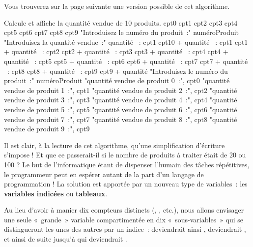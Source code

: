		Vous trouverez sur la page suivante
		une version possible de cet algorithme.
	
		\begin{LDA}
		\LComment Calcule et affiche la quantité vendue de 10 produits.
			\Empty
			\Empty
			\Let cpt0 
			\Let cpt1 
			\Let cpt2 
			\Let cpt3 
			\Let cpt4 
			\Let cpt5 
			\Let cpt6 
			\Let cpt7 
			\Let cpt8 
			\Let cpt9 
			\Empty
			\Write "Introduisez le numéro du produit~:"
			\Read numéroProduit
			\Empty
			\Empty
				\Write "Introduisez la quantité vendue~:"
				\Read quantité
				\Empty
					~: cpt1 \Gets cpt10 + quantité
					~: cpt1 \Gets cpt1 + quantité
					~: cpt2 \Gets cpt2 + quantité
					~: cpt3 \Gets cpt3 + quantité
					~: cpt4 \Gets cpt4 + quantité
					~: cpt5 \Gets cpt5 + quantité
					~: cpt6 \Gets cpt6 + quantité
					~: cpt7 \Gets cpt7 + quantité
					~: cpt8 \Gets cpt8 + quantité
					~: cpt9 \Gets cpt9 + quantité
				\EndSwitch
				\Empty
				\Write "Introduisez le numéro du produit~:"
				\Read numéroProduit
				\Empty
			\EndWhile
			\Empty
			\Write "quantité vendue de produit 0~:", cpt0
			\Write "quantité vendue de produit 1~:", cpt1
			\Write "quantité vendue de produit 2~:", cpt2
			\Write "quantité vendue de produit 3~:", cpt3
			\Write "quantité vendue de produit 4~:", cpt4
			\Write "quantité vendue de produit 5~:", cpt5
			\Write "quantité vendue de produit 6~:", cpt6
			\Write "quantité vendue de produit 7~:", cpt7
			\Write "quantité vendue de produit 8~:", cpt8
			\Write "quantité vendue de produit 9~:", cpt9
			\Empty
		\EndAlgo
		\end{LDA}
	
		Il est clair, à la lecture de cet algorithme, 
		qu’une simplification d’écriture s’impose ! 
		Et que ce passerait-il si le nombre de produits à
		traiter était de 20 ou 100 ? 
		Le but de l’informatique étant de dispenser l’humain 
		des tâches répétitives, 
		le programmeur peut en espérer autant 
		de la part d’un langage de programmation !
		La solution est apportée par un nouveau type de variables~: 
		les \textbf{variables indicées} ou \textbf{tableaux}.
	
		Au lieu d’avoir à manier dix compteurs distincts
		(, , etc.), 
		nous allons envisager une seule «~grande~» variable 
		 compartimentée en dix «~sous-variables~» 
		qui se distingueront les unes des autres par un indice~: 
		 deviendrait ainsi , 
		 deviendrait , 
		et ainsi de suite jusqu’à
		 qui deviendrait .
	
